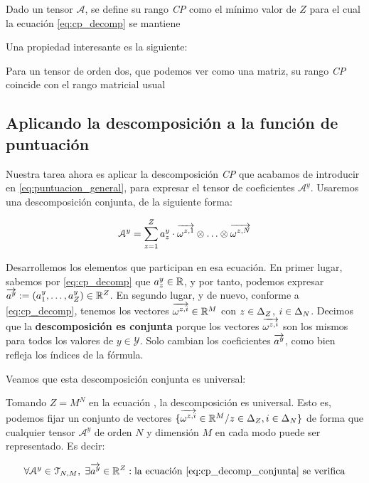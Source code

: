 \begin{definicion}
    Dado un tensor $\mathcal{A}$, se define su rango \textit{CP} como el mínimo valor de $Z$ para el cual la ecuación \eqref{eq:cp_decomp} se mantiene

\end{definicion}

Una propiedad interesante es la siguiente:

\begin{proposicion}[]
    Para un tensor de orden dos, que podemos ver como una matriz, su rango \textit{CP} coincide con el rango matricial usual
\end{proposicion}

\subsection{Aplicando la descomposición a la función de puntuación}

Nuestra tarea ahora es aplicar la descomposición \textit{CP} que acabamos de introducir en \eqref{eq:puntuacion_general}, para expresar el tensor de coeficientes $\mathcal{A}^y$. Usaremos una descomposición conjunta, de la siguiente forma:

\begin{equation} \label{eq:cp_decomp_conjunta}
    \mathcal{A}^y = \sum_{z = 1}^Z a_z^y \cdot \overrightarrow{\omega^{z, 1}} \otimes \ldots \otimes \overrightarrow{\omega^{z, N}}
\end{equation}

Desarrollemos los elementos que participan en esa ecuación. En primer lugar, sabemos por \eqref{eq:cp_decomp} que $a_z^y \in \mathbb{R}$, y por tanto, podemos expresar $\overrightarrow{a^y} := (a_1^y, \ldots, a_Z^y) \in \mathbb{R}^Z$. En segundo lugar, y de nuevo, conforme a \eqref{eq:cp_decomp}, tenemos los vectores $\overrightarrow{\omega^{z, i}} \in \mathbb{R}^M$ con $z \in \Delta_{Z}$, $i \in \Delta_{N}$. Decimos que la \textbf{descomposición es conjunta} porque los vectores $\overrightarrow{\omega^{z, i}}$ son los mismos para todos los valores de $y \in \mathcal{Y}$. Solo cambian los coeficientes $\overrightarrow{a^y}$, como bien refleja los índices de la fórmula.

Veamos que esta descomposición conjunta es universal:

\begin{proposicion}
    Tomando $Z = M^N$ en la ecuación , la descomposición es universal. Esto es, podemos fijar un conjunto de vectores $\{\overrightarrow{\omega^{z, i}} \in \mathbb{R}^M / z \in \Delta_{Z}, i \in \Delta_{N} \}$ de forma que cualquier tensor $\mathcal{A}^y$ de orden $N$ y dimensión $M$ en cada modo puede ser representado. Es decir:

    \begin{equation}
        \forall \mathcal{A}^y \in \espaciotensores{N}{M}, \; \exists \nv{a^y} \in \R^Z: \text{la ecuación \refeq{eq:cp_decomp_conjunta} se verifica}
    \end{equation}
\end{proposicion}

